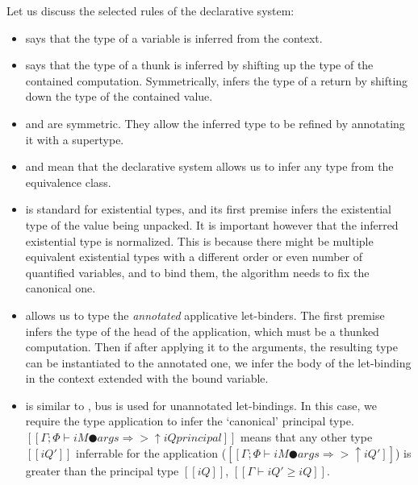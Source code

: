 Let us discuss the selected rules of the declarative system:
\begin{itemize}
  \item {}
    says that the type of a variable is inferred from the context.
  \item {} says
    that the type of a thunk is inferred by shifting up the type of the 
    contained computation. Symmetrically, 
    infers the type of a return by shifting down the type of the
    contained value.
  \item {} and  are symmetric.
    They allow the inferred type to be refined by annotating it with a supertype.
  \item {} and 
    mean that the declarative system allows us to infer any type from the equivalence class.
  \item {} is standard for existential types,
    and its first premise infers the existential type of the value being unpacked.
    It is important however that the inferred existential type is normalized. 
    This is because there might be multiple equivalent existential types 
    with a different order or even number of quantified variables, 
    and to bind them, the algorithm needs to fix the canonical one.
  \item {} allows us to
    type the \emph{annotated} applicative let-binders. 
    The first premise infers the type of the head of the application,
    which must be a thunked computation. Then if after applying it 
    to the arguments, the resulting type can be instantiated to the annotated one,
    we infer the body of the let-binding in the context extended with the bound variable.
  \item {} is similar to ,
    bus is used for unannotated let-bindings. In this case, 
    we require the type application to infer the `canonical' principal type.
    $[[Γ ; Φ ⊢ iM ● args ⇒> ↑iQ principal]]$ means that
    any other type $[[iQ']]$ inferrable for the application (\ie $[[Γ ; Φ ⊢ iM ● args ⇒> ↑iQ']]$)
    is greater than the principal type $[[iQ]]$, \ie $[[Γ ⊢ iQ' ≥ iQ]]$.
\end{itemize}


